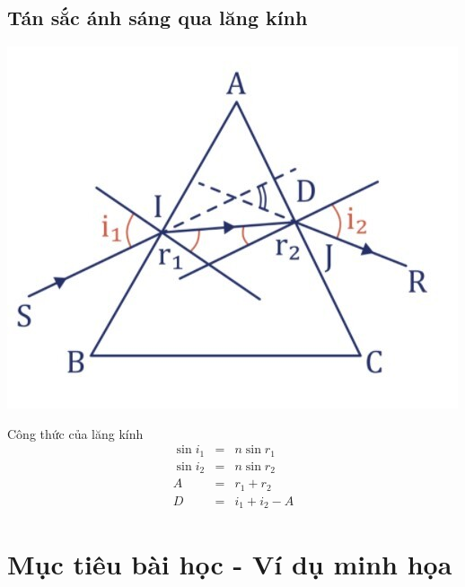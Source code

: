 \subsection{Tán sắc ánh sáng qua lăng kính}
\begin{center}
	\includegraphics[scale=0.5]{../figs/VN12-PH-32-A-016-1-2.jpg}
\end{center}
Công thức của lăng kính
	\begin{equation}\label{eq:tansac3}
		\begin{array}{rcl}
			\sin i_1&=&n\sin r_1\\
				\sin i_2&=&n\sin r_2\\
				A&=&r_1+r_2\\
				D&=&i_1+i_2-A
		\end{array}
	\end{equation}

\section{Mục tiêu bài học - Ví dụ minh họa}

